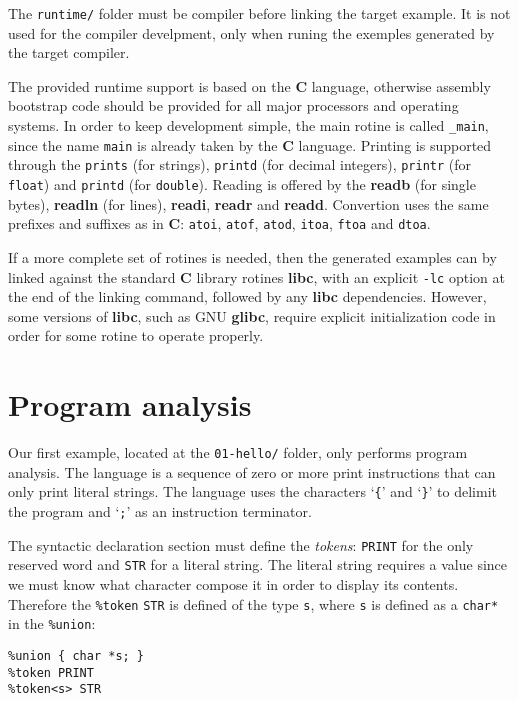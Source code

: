 \documentclass[a4paper]{article}
\begin{document}
The {\tt runtime/} folder must be compiler before linking the target example. It is not used for the compiler develpment, only when runing the exemples generated by the target compiler. 

The provided runtime support is based on the {\bf C} language, otherwise assembly bootstrap code should be provided for all major processors and operating systems. In order to keep development simple, the main rotine is called {\tt \_main}, since the name {\tt main} is already taken by the {\bf C} language. Printing is supported through the {\tt prints} (for strings), {\tt printd} (for decimal integers), {\tt printr} (for {\tt float}) and {\tt printd} (for {\tt double}). Reading is offered by the {\bf readb} (for single bytes), {\bf readln} (for lines), {\bf readi}, {\bf readr} and {\bf readd}. Convertion uses the same prefixes and suffixes as in {\bf C}: {\tt atoi}, {\tt atof}, {\tt atod}, {\tt itoa}, {\tt ftoa} and {\tt dtoa}.

If a more complete set of rotines is needed, then the generated examples can by linked against the standard {\bf C} library rotines {\bf libc}, with an explicit {\tt -lc} option at the end of the linking command, followed by any {\bf libc} dependencies. However, some versions of {\bf libc}, such as {\sc GNU} {\bf glibc}, require explicit initialization code in order for some rotine to operate properly.

\section{Program analysis} %

Our first example, located at the {\tt 01-hello/} folder, only performs program analysis. The language is a sequence of zero or more print instructions that can only print literal strings. The language uses the characters `{\tt \{}' and `{\tt \}}' to delimit the program and `{\tt ;}' as an instruction terminator.

The syntactic declaration section must define the {\em tokens}: {\tt PRINT} for the only reserved word and {\tt STR} for a literal string. The literal string requires a value since we must know what character compose it in order to display its contents. Therefore the {\tt \%token} {\tt STR} is defined of the type {\tt s}, where {\tt s} is defined as a {\tt char*} in the {\tt \%union}:
\begin{verbatim}
%union { char *s; }
%token PRINT
%token<s> STR
\end{verbatim}
\end{document}
